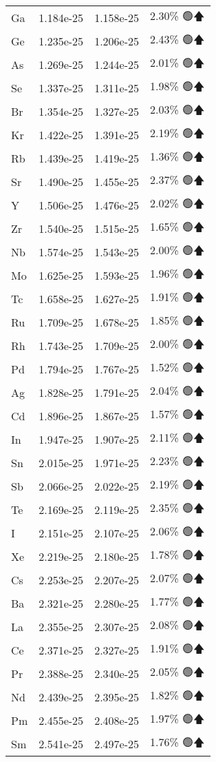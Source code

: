 \begin{longtable}{|l|c|c|c|}
Ga & 1.184e-25 & 1.158e-25 & 2.30\% 🟢🡅 \\
Ge & 1.235e-25 & 1.206e-25 & 2.43\% 🟢🡅 \\
As & 1.269e-25 & 1.244e-25 & 2.01\% 🟢🡅 \\
Se & 1.337e-25 & 1.311e-25 & 1.98\% 🟢🡅 \\
Br & 1.354e-25 & 1.327e-25 & 2.03\% 🟢🡅 \\
Kr & 1.422e-25 & 1.391e-25 & 2.19\% 🟢🡅 \\
Rb & 1.439e-25 & 1.419e-25 & 1.36\% 🟢🡅 \\
Sr & 1.490e-25 & 1.455e-25 & 2.37\% 🟢🡅 \\
Y & 1.506e-25 & 1.476e-25 & 2.02\% 🟢🡅 \\
Zr & 1.540e-25 & 1.515e-25 & 1.65\% 🟢🡅 \\
Nb & 1.574e-25 & 1.543e-25 & 2.00\% 🟢🡅 \\
Mo & 1.625e-25 & 1.593e-25 & 1.96\% 🟢🡅 \\
Tc & 1.658e-25 & 1.627e-25 & 1.91\% 🟢🡅 \\
Ru & 1.709e-25 & 1.678e-25 & 1.85\% 🟢🡅 \\
Rh & 1.743e-25 & 1.709e-25 & 2.00\% 🟢🡅 \\
Pd & 1.794e-25 & 1.767e-25 & 1.52\% 🟢🡅 \\
Ag & 1.828e-25 & 1.791e-25 & 2.04\% 🟢🡅 \\
Cd & 1.896e-25 & 1.867e-25 & 1.57\% 🟢🡅 \\
In & 1.947e-25 & 1.907e-25 & 2.11\% 🟢🡅 \\
Sn & 2.015e-25 & 1.971e-25 & 2.23\% 🟢🡅 \\
Sb & 2.066e-25 & 2.022e-25 & 2.19\% 🟢🡅 \\
Te & 2.169e-25 & 2.119e-25 & 2.35\% 🟢🡅 \\
I & 2.151e-25 & 2.107e-25 & 2.06\% 🟢🡅 \\
Xe & 2.219e-25 & 2.180e-25 & 1.78\% 🟢🡅 \\
Cs & 2.253e-25 & 2.207e-25 & 2.07\% 🟢🡅 \\
Ba & 2.321e-25 & 2.280e-25 & 1.77\% 🟢🡅 \\
La & 2.355e-25 & 2.307e-25 & 2.08\% 🟢🡅 \\
Ce & 2.371e-25 & 2.327e-25 & 1.91\% 🟢🡅 \\
Pr & 2.388e-25 & 2.340e-25 & 2.05\% 🟢🡅 \\
Nd & 2.439e-25 & 2.395e-25 & 1.82\% 🟢🡅 \\
Pm & 2.455e-25 & 2.408e-25 & 1.97\% 🟢🡅 \\
Sm & 2.541e-25 & 2.497e-25 & 1.76\% 🟢🡅 \\

\end{longtable}
